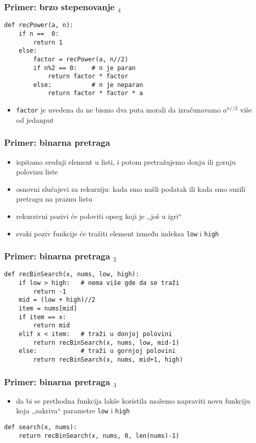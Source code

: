 \documentclass[utf8,compress,aspectratio=169]{beamer}
\begin{document}
\begin{frame}[fragile]
  \frametitle{Primer: brzo stepenovanje $_4$}
\begin{verbatim}
def recPower(a, n):
    if n ==  0:
        return 1
    else:
        factor = recPower(a, n//2)
        if n%2 == 0:    # n je paran
            return factor * factor
        else:           # n je neparan
            return factor * factor * a
\end{verbatim}
  \begin{itemize}
    \item {} \texttt{factor} je uvedena da ne bismo dva puta morali da izračunavamo $a^{n//2}$ više od jedanput
  \end{itemize}
\end{frame}

\begin{frame}[fragile]
  \frametitle{Primer: binarna pretraga}
  \begin{itemize}
    \item ispitamo srednji element u listi, i potom pretražujemo donju ili gornju polovinu liste
    \item osnovni slučajevi za rekurziju: kada smo našli podatak ili kada smo suzili pretragu na praznu listu
    \item rekurzivni pozivi će poloviti opseg koji je ,,još u igri``
    \item svaki poziv funkcije će tražiti element između indeksa \texttt{low} i \texttt{high}
  \end{itemize}
\end{frame}

\begin{frame}[fragile]
  \frametitle{Primer: binarna pretraga $_2$}
\begin{verbatim}
def recBinSearch(x, nums, low, high):
    if low > high:   # nema više gde da se traži
        return -1
    mid = (low + high)//2
    item = nums[mid]
    if item == x:
        return mid
    elif x < item:   # traži u donjoj polovini
        return recBinSearch(x, nums, low, mid-1)
    else:            # traži u gornjoj polovini
        return recBinSearch(x, nums, mid+1, high)
\end{verbatim}
\end{frame}

\begin{frame}[fragile]
  \frametitle{Primer: binarna pretraga $_3$}
  \begin{itemize}
    \item da bi se prethodna funkcija lakše koristila možemo napraviti novu funkciju koja ,,sakriva`` parametre \texttt{low} i \texttt{high}
  \end{itemize}
\begin{verbatim}
def search(x, nums):
    return recBinSearch(x, nums, 0, len(nums)-1)
\end{verbatim}
\end{frame}
\end{document}
